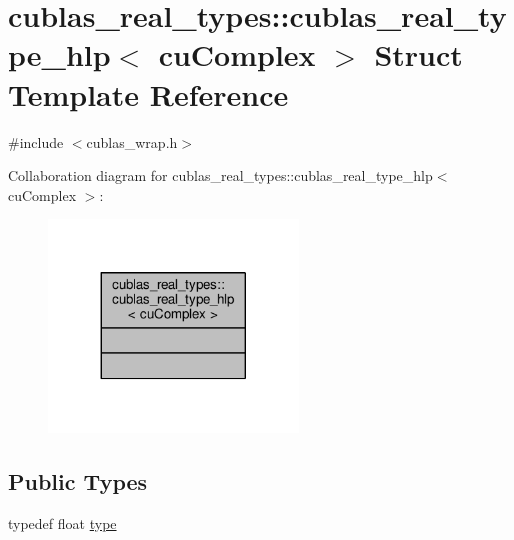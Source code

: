 \hypertarget{structcublas__real__types_1_1cublas__real__type__hlp_3_01cuComplex_01_4}{\section{cublas\-\_\-real\-\_\-types\-:\-:cublas\-\_\-real\-\_\-type\-\_\-hlp$<$ cu\-Complex $>$ Struct Template Reference}
\label{structcublas__real__types_1_1cublas__real__type__hlp_3_01cuComplex_01_4}
}


{\ttfamily \#include $<$cublas\-\_\-wrap.\-h$>$}



Collaboration diagram for cublas\-\_\-real\-\_\-types\-:\-:cublas\-\_\-real\-\_\-type\-\_\-hlp$<$ cu\-Complex $>$\-:\nopagebreak
\begin{figure}[H]
\begin{center}
\leavevmode
\includegraphics[width=188pt]{structcublas__real__types_1_1cublas__real__type__hlp_3_01cuComplex_01_4__coll__graph}
\end{center}
\end{figure}
\subsection*{Public Types}
\begin{DoxyCompactItemize}
\item 
typedef float \hyperlink{structcublas__real__types_1_1cublas__real__type__hlp_3_01cuComplex_01_4_a0d3a1211ab64a0a4782bbb8f34e9a727}{type}
\end{DoxyCompactItemize}


